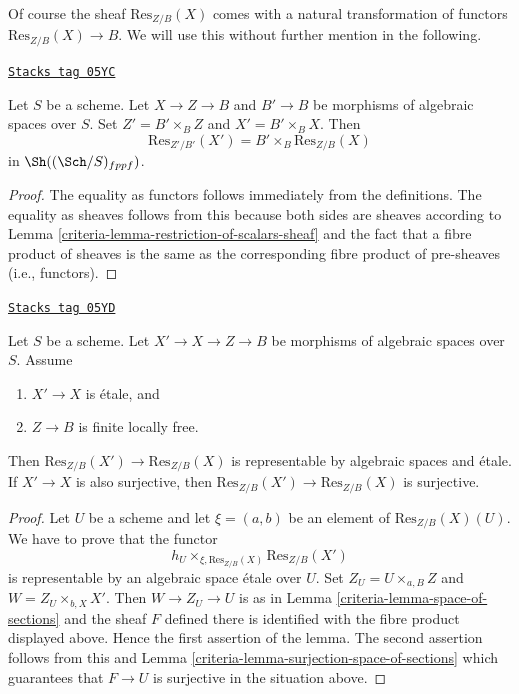 Of course the sheaf $\text{Res}_{Z/B}(X)$ comes with a natural transformation
of functors $\text{Res}_{Z/B}(X) \to B$. We will use this without further
mention in the following.

\begin{lemma}
\label{criteria-lemma-etale-base-change-restriction-of-scalars}
\href{https://stacks.math.columbia.edu/tag/05YC}{\texttt{Stacks tag 05YC}}

Let $S$ be a scheme. Let $X \to Z \to B$ and $B' \to B$
be morphisms of algebraic spaces over $S$.
Set $Z' = B' \times_B Z$ and $X' = B' \times_B X$. Then
$$
\text{Res}_{Z'/B'}(X')
=
B' \times_B \text{Res}_{Z/B}(X)
$$
in $\Sh((\Sch/S)_{fppf})$.
\end{lemma}

\begin{proof}

The equality as functors follows immediately from the definitions.
The equality as sheaves follows from this because both sides are
sheaves according to
Lemma \ref{criteria-lemma-restriction-of-scalars-sheaf}
and the fact that a fibre product of sheaves is the same as the
corresponding fibre product of pre-sheaves (i.e., functors).
\end{proof}

\begin{lemma}
\label{criteria-lemma-etale-covering-restriction-of-scalars}
\href{https://stacks.math.columbia.edu/tag/05YD}{\texttt{Stacks tag 05YD}}

Let $S$ be a scheme. Let $X' \to X \to Z \to B$ be morphisms of
algebraic spaces over $S$. Assume
\begin{enumerate}
\item $X' \to X$ is \'etale, and
\item $Z \to B$ is finite locally free.
\end{enumerate}
Then $\text{Res}_{Z/B}(X') \to \text{Res}_{Z/B}(X)$ is representable
by algebraic spaces and \'etale. If $X' \to X$ is also surjective,
then $\text{Res}_{Z/B}(X') \to \text{Res}_{Z/B}(X)$ is surjective.
\end{lemma}

\begin{proof}

Let $U$ be a scheme and let $\xi = (a, b)$ be an element of
$\text{Res}_{Z/B}(X)(U)$. We have to prove that the functor
$$
h_U \times_{\xi, \text{Res}_{Z/B}(X)} \text{Res}_{Z/B}(X')
$$
is representable by an algebraic space \'etale over $U$. Set
$Z_U = U \times_{a, B} Z$ and $W = Z_U \times_{b, X} X'$.
Then $W \to Z_U \to U$ is as in
Lemma \ref{criteria-lemma-space-of-sections}
and the sheaf $F$ defined there is identified with the fibre product
displayed above. Hence the first assertion of the lemma.
The second assertion follows from this and
Lemma \ref{criteria-lemma-surjection-space-of-sections}
which guarantees that $F \to U$ is surjective in the situation above.
\end{proof}

